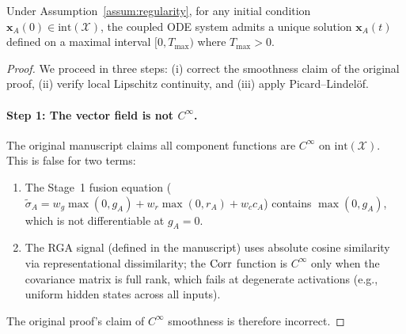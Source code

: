 \begin{proposition}
\label{prop:local-existence}
Under Assumption~\ref{assum:regularity}, for any initial condition
$\mathbf{x}_A(0) \in \text{int}(\mathcal{X})$, the coupled ODE system
admits a unique solution $\mathbf{x}_A(t)$ defined on a maximal interval
$[0, T_{\max})$ where $T_{\max} > 0$.
\end{proposition}

\begin{proof}
We proceed in three steps: (i) correct the smoothness claim of the
original proof, (ii) verify local Lipschitz continuity, and (iii)
apply Picard--Lindelöf.

\paragraph{Step 1: The vector field is not $C^\infty$.}
The original manuscript claims all component functions are
$C^\infty$ on $\text{int}(\mathcal{X})$. This is false for two terms:
\begin{enumerate}[nosep]
\item The Stage~1 fusion equation ($\tilde{\sigma}_A = w_g \max(0, g_A) + w_r \max(0, r_A) + w_c c_A$) contains $\max(0, g_A)$,
  which is not differentiable at $g_A = 0$.
\item The RGA signal (defined in the manuscript) uses absolute cosine similarity
  via representational dissimilarity; the $\operatorname{Corr}$ function is $C^\infty$
  only when the covariance matrix is full rank, which fails at degenerate
  activations (e.g., uniform hidden states across all inputs).
\end{enumerate}
The original proof's claim of $C^\infty$ smoothness is therefore incorrect.


\end{proof}
